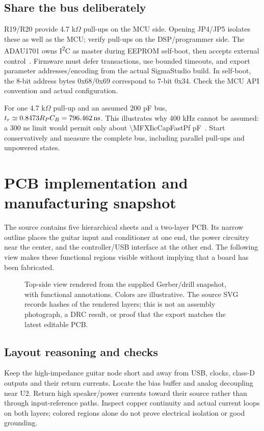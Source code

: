 \documentclass[a4paper,10pt]{article}
\newcommand{\nextsection}[1]{\clearpage\section{#1}}
\newcommand{\calc}[1]{\num[round-precision=3]{#1}}
\begin{document}
\subsection{Share the bus deliberately}
R19/R20 provide 4.7 k$\Omega$ pull-ups on the MCU side. Opening JP4/JP5 isolates these as well as the MCU; verify pull-ups on the DSP/programmer side. The ADAU1701 owns I\textsuperscript{2}C as master during EEPROM self-boot, then accepts external control~\cite{adau,an923}. Firmware must defer transactions, use bounded timeouts, and export parameter addresses/encoding from the actual SigmaStudio build. In self-boot, the 8-bit address bytes 0x68/0x69 correspond to 7-bit 0x34. Check the MCU API convention and actual configuration.

For one 4.7 k$\Omega$ pull-up and an assumed 200 pF bus, $t_r\simeq0.8473R_PC_B=\SI{796.462}{\nano\second}$. This illustrates why 400 kHz cannot be assumed: a 300 ns limit would permit only about \calc{\MFXIicCapFastPf} pF~\cite{i2c}. Start conservatively and measure the complete bus, including parallel pull-ups and unpowered states.

\nextsection{PCB implementation and manufacturing snapshot}
\label{sec:pcb}
The source contains five hierarchical sheets and a two-layer PCB. Its narrow outline places the guitar input and conditioner at one end, the power circuitry near the center, and the controller/USB interface at the other end. The following view makes these functional regions visible without implying that a board has been fabricated.

\begin{figure}[H]\centering\MFXPcbLayoutDiagram
\caption{Top-side view rendered from the supplied Gerber/drill snapshot, with functional annotations. Colors are illustrative. The source SVG records hashes of the rendered layers; this is not an assembly photograph, a DRC result, or proof that the export matches the latest editable PCB.}\label{fig:pcb}
\end{figure}

\subsection{Layout reasoning and checks}
Keep the high-impedance guitar node short and away from USB, clocks, class-D outputs and their return currents. Locate the bias buffer and analog decoupling near U2. Return high speaker/power currents toward their source rather than through input-reference paths. Inspect copper continuity and actual current loops on both layers; colored regions alone do not prove electrical isolation or good grounding.
\end{document}
